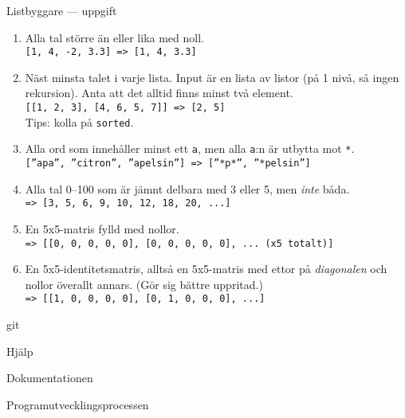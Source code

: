 \documentclass{beamer}
\begin{document}
  \begin{frame}{Listbyggare --- uppgift}

    \footnotesize

    \pause{}

    \begin{enumerate}[<+->]
      \item Alla tal större än eller lika med noll. \\
            \texttt{[1, 4, -2, 3.3] => [1, 4, 3.3]}

      \item Näst minsta talet i varje lista. Input är en lista av listor (på 1
            nivå, så ingen rekursion). Anta att det alltid finns minst två element. \\
            \texttt{[[1, 2, 3], [4, 6, 5, 7]] => [2, 5]} \\
            Tips: kolla på \texttt{sorted}.

      \item Alla ord som innehåller minst ett \texttt{a}, men alla \texttt{a}:n
            är utbytta mot \texttt{*}. \\
            \texttt{[''apa'', ''citron'', ''apelsin''] => [''*p*'', ''*pelsin'']}

      \item Alla tal 0--100 som är jämnt delbara med 3 eller 5, men
            \emph{inte} båda. \\
            \texttt{=> [3, 5, 6, 9, 10, 12, 18, 20, ...]}

      \item En 5x5-matris fylld med nollor. \\
            \texttt{=> [[0, 0, 0, 0, 0], [0, 0, 0, 0, 0], ... (x5 totalt)]}

      \item En 5x5-identitetsmatris, alltså en 5x5-matris med ettor på
            \emph{diagonalen} och nollor överallt annars. (Gör sig bättre uppritad.) \\
            \texttt{=> [[1, 0, 0, 0, 0], [0, 1, 0, 0, 0], ...]}


    \end{enumerate}

  \end{frame}

  \begin{frame}{git}

  \end{frame}

  \begin{frame}{Hjälp}

  \end{frame}

  \begin{frame}{Dokumentationen}

  \end{frame}

  \begin{frame}{Programutvecklingsprocessen}

  \end{frame}
\end{document}
